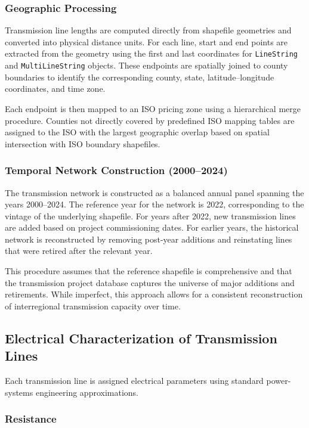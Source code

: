 \documentclass[12pt]{article}
\begin{document}
\subsubsection{Geographic Processing}

Transmission line lengths are computed directly from shapefile geometries and converted into physical distance units. For each line, start and end points are extracted from the geometry using the first and last coordinates for \texttt{LineString} and \texttt{MultiLineString} objects. These endpoints are spatially joined to county boundaries to identify the corresponding county, state, latitude--longitude coordinates, and time zone.

Each endpoint is then mapped to an ISO pricing zone using a hierarchical merge procedure. Counties not directly covered by predefined ISO mapping tables are assigned to the ISO with the largest geographic overlap based on spatial intersection with ISO boundary shapefiles.

\subsubsection{Temporal Network Construction (2000--2024)}

The transmission network is constructed as a balanced annual panel spanning the years 2000--2024. The reference year for the network is 2022, corresponding to the vintage of the underlying shapefile. For years after 2022, new transmission lines are added based on project commissioning dates. For earlier years, the historical network is reconstructed by removing post-year additions and reinstating lines that were retired after the relevant year.

This procedure assumes that the reference shapefile is comprehensive and that the transmission project database captures the universe of major additions and retirements. While imperfect, this approach allows for a consistent reconstruction of interregional transmission capacity over time.

\subsection{Electrical Characterization of Transmission Lines}

Each transmission line is assigned electrical parameters using standard power-systems engineering approximations.

\subsubsection{Resistance}
\end{document}
